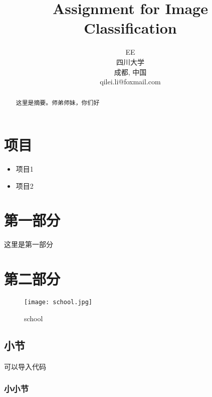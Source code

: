 \documentclass[10pt, conference, compsocconf]{IEEEtran}
\begin{document}
	\begin{CJK}{UTF8}{gbsn}

\title{Assignment for Image Classification}

\author
{
    \IEEEauthorblockA
    {
    EE\\
    四川大学\\
    成都, 中国\\
    qilei.li@foxmail.com
    }
}

\maketitle

\begin{abstract}
这里是摘要。师弟师妹，你们好
\end{abstract}


\IEEEpeerreviewmaketitle

\section{项目}
\begin{itemize}
	\item	项目1
	\item	项目2

	
\end{itemize}

\section{第一部分}
这里是第一部分

\section{第二部分}
\begin{figure}[h]
	\texttt{[image: school.jpg]}
	\caption{school} 
	\label{school}
\end{figure}




\subsection{小节}
可以导入代码



\subsubsection{小小节}


\end{CJK}
\end{document}
